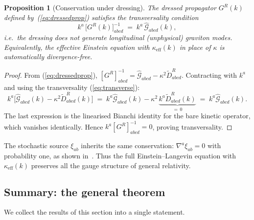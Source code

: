 \documentclass[12pt,a4paper]{article}
\newtheorem{proposition}[theorem]{Proposition}
\begin{document}
\begin{proposition}[Conservation under dressing]\label{prop:Ward}
The dressed propagator $G^{R}(k)$ defined by~\textup{(\ref{eq:dressedprop})} satisfies the transversality condition
\begin{equation}\label{eq:Wardprop}
  k^{a}\,\bigl[G^{R}(k)\bigr]^{-1}_{abcd} \;=\; k^{a}\,\hat{\mathcal{G}}_{abcd}(k),
\end{equation}
i.e.\ the dressing does not generate longitudinal (unphysical) graviton modes.
Equivalently, the effective Einstein equation with $\kappa_{\mathrm{eff}}(k)$ in place of $\kappa$ is automatically divergence-free.
\end{proposition}

\begin{proof}
From (\ref{eq:dressedprop}),
$[G^{R}]^{-1}_{abcd} = \hat{\mathcal{G}}_{abcd} - \kappa^{2}\tilde{D}^{R}_{abcd}$.
Contracting with $k^{a}$ and using the transversality (\ref{eq:transverse}):
\[
  k^{a}\bigl[\hat{\mathcal{G}}_{abcd}(k) - \kappa^{2}\tilde{D}^{R}_{abcd}(k)\bigr]
  \;=\;
  k^{a}\hat{\mathcal{G}}_{abcd}(k) - \kappa^{2}\,\underbrace{k^{a}\tilde{D}^{R}_{abcd}(k)}_{=\,0}
  \;=\;
  k^{a}\hat{\mathcal{G}}_{abcd}(k).
\]
The last expression is the linearised Bianchi identity for the bare kinetic operator, which vanishes identically.
Hence $k^{a}[G^{R}]^{-1}_{abcd}=0$, proving transversality.
\end{proof}

\noindent
The stochastic source $\xi_{ab}$ inherits the same conservation: $\nabla^{a}\xi_{ab}=0$ with probability one, as shown in~\cite{HuVerdaguer2004}.
Thus the full Einstein--Langevin equation with $\kappa_{\mathrm{eff}}(k)$ preserves all the gauge structure of general relativity.

\subsection{Summary: the general theorem}\label{sec:theorem}

We collect the results of this section into a single statement.
\end{document}
